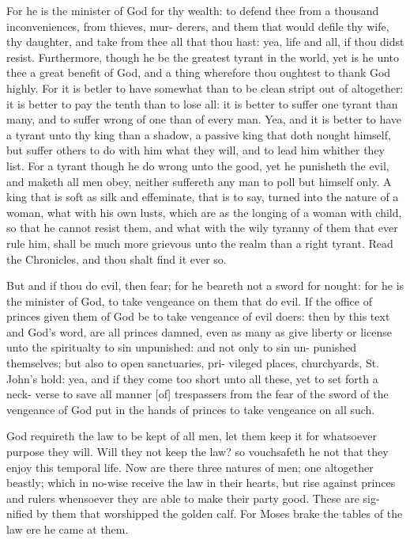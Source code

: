 \documentclass{custom}
\begin{document}
For he is the minister of God for thy wealth: to defend 
thee from a thousand inconveniences, from thieves, mur- 
derers, and them that would defile thy wife, thy daughter, 
and take from thee all that thou hast: yea, life and all, 
if thou didst resist. Furthermore, though he be the 
greatest tyrant in the world, yet is he unto thee a great 
benefit of God, and a thing wherefore thou oughtest to 
thank God highly. For it is betler to have somewhat 
than to be clean stript out of altogether: it is better 
to pay the tenth than to lose all: it is better to 
suffer one tyrant than many, and to suffer wrong of one 
than of every man. Yea, and it is better to have a tyrant 
unto thy king than a shadow, a passive king that doth 
nought himself, but suffer others to do with him what they 
will, and to lead him whither they list. For a tyrant 
though he do wrong unto the good, yet he punisheth the 
evil, and maketh all men obey, neither suffereth any man 
to poll but himself only. A king that is soft as silk and 
effeminate, that is to say, turned into the nature of a 
woman, what with his own lusts, which are as the longing 
of a woman with child, so that he cannot resist them, and 
what with the wily tyranny of them that ever rule him, shall 
be much more grievous unto the realm than a right tyrant. 
Read the Chronicles, and thou shalt find it ever so.

But and if thou do evil, then fear; for he beareth not 
a sword for nought: for he is the minister of God, to 
take vengeance on them that do evil. If the office of 
princes given them of God be to take vengeance of evil 
doers: then by this text and God's word, are all princes 
damned, even as many as give liberty or license unto the 
spiritualty to sin unpunished: and not only to sin un- 
punished themselves; but also to open sanctuaries, pri- 
vileged places, churchyards, St. John's hold: yea, and if 
they come too short unto all these, yet to set forth a neck- 
verse to save all manner [of] trespassers from the fear of the 
sword of the vengeance of God put in the hands of princes 
to take vengeance on all such. 

God requireth the law to be kept of all men, let them
keep it for whatsoever purpose they will. Will they not 
keep the law? so vouchsafeth he not that they enjoy this
temporal life. Now are there three natures of men; one 
altogether beastly; which in no-wise receive the law in 
their hearts, but rise against princes and rulers whensoever 
they are able to make their party good. These are sig- 
nified by them that worshipped the golden calf. For 
Moses brake the tables of the law ere he came at 
them.
\end{document}
